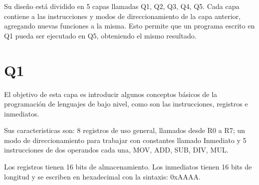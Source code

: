 Su diseño está dividido en 5 capas llamadas Q1, Q2, Q3, Q4, Q5. Cada capa contiene a las instrucciones y modos de direccionamiento
de la capa anterior, agregando nuevas funciones a la misma. Esto permite que un programa escrito en Q1 pueda ser ejecutado en Q5, obteniendo el mismo resultado.

\section{Q1}
El objetivo de esta capa es introducir algunos conceptos básicos de la programación de lenguajes de bajo nivel, como son las instrucciones, registros e inmediatos.

Sus caracteristicas son: 8 registros de uso general, llamados desde R0 a R7; un modo de direccionamiento para trabajar con constantes llamado Inmediato y 5 instrucciones de dos operandos cada una, MOV, ADD, SUB, DIV, MUL.

Los registros tienen 16 bits de almacenamiento. Los inmediatos tienen 16 bits de longitud y se escriben en hexadecimal con la 
sintaxis: 0xAAAA.

